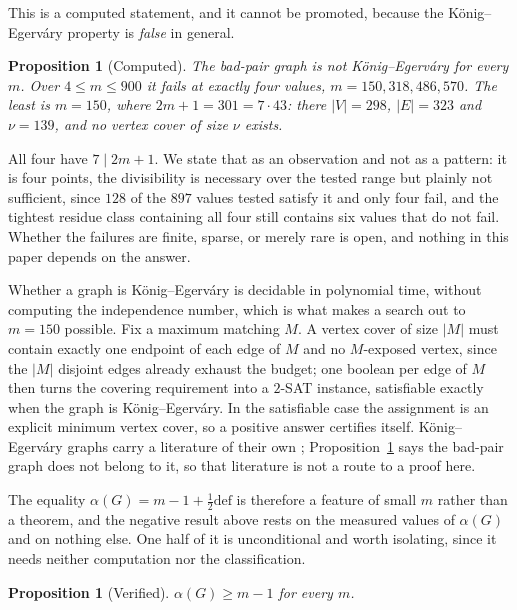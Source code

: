 \documentclass[11pt]{amsart}
\theoremstyle{plain}
\newtheorem{proposition}[theorem]{Proposition}
\theoremstyle{definition}
\begin{document}
This is a computed statement, and it cannot be promoted, because the K\"onig--Egerv\'ary property
is \emph{false} in general.

\begin{proposition}[Computed]\label{prop:ke-false}
The bad-pair graph is not K\"onig--Egerv\'ary for every $m$. Over $4 \le m \le 900$ it fails at
exactly four values, $m = 150, 318, 486, 570$. The least is $m = 150$, where $2m+1 = 301 = 7\cdot43$:
there $|V| = 298$, $|E| = 323$ and $\nu = 139$, and no vertex cover of size $\nu$ exists.
\end{proposition}

All four have $7 \mid 2m+1$. We state that as an observation and not as a pattern: it is four points,
the divisibility is necessary over the tested range but plainly not sufficient, since $128$ of the
$897$ values tested satisfy it and only four fail, and the tightest residue class containing all
four still contains six values that do not fail. Whether the failures are finite, sparse, or merely
rare is open, and nothing in this paper depends on the answer.

Whether a graph is K\"onig--Egerv\'ary is decidable in polynomial time, without computing the
independence number, which is what makes a search out to $m = 150$ possible. Fix a maximum matching
$M$. A vertex cover of size $|M|$ must contain exactly one endpoint of each edge of $M$ and no
$M$-exposed vertex, since the $|M|$ disjoint edges already exhaust the budget; one boolean per edge
of $M$ then turns the covering requirement into a $2$-SAT instance, satisfiable exactly when the
graph is K\"onig--Egerv\'ary. In the satisfiable case the assignment is an explicit minimum vertex
cover, so a positive answer certifies itself. K\"onig--Egerv\'ary graphs carry a literature of
their own \cite{Dem,Ste,Lar}; Proposition~\ref{prop:ke-false} says the bad-pair graph does not
belong to it, so that literature is not a route to a proof here.

The equality $\alpha(G) = m - 1 + \tfrac12\mathrm{def}$ is therefore a feature of small $m$ rather
than a theorem, and the negative result above rests on the measured values of $\alpha(G)$ and on
nothing else. One half of it is unconditional and worth isolating, since it needs neither
computation nor the classification.

\begin{proposition}[Verified]\label{prop:alpha-m-1}
$\alpha(G) \ge m-1$ for every $m$.
\end{proposition}
\end{document}
